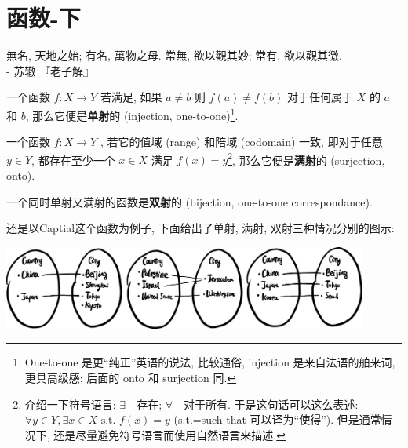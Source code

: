 \section{函数-下}\label{004}

\begin{flushright}{\kaishu 無名, 天地之始; 有名, 萬物之母. 常無, 欲以觀其妙; 常有, 欲以觀其徼. \\- 苏辙 『老子解』}\end{flushright}

\begin{tcolorbox}[size=fbox, breakable, enhanced jigsaw, title={单射, 满射, 双射 (injection, surjection,
bijection)}]

一个函数 $f:X\rightarrow Y$ 若满足, 如果 $a\neq b$ 则
$f(a)\neq f(b)$ 对于任何属于 $X$ 的 $a$ 和 $b$,
那么它便是\textbf{单射}的 (injection, one-to-one)\footnote{One-to-one
  是更``纯正''英语的说法, 比较通俗, injection 是来自法语的舶来词,
  更具高级感; 后面的 onto 和 surjection 同.}.

一个函数 $f:X\rightarrow Y$ , 若它的值域 (range) 和陪域 (codomain)
一致, 即对于任意 $y\in Y$, 都存在至少一个 $x\in X$ 满足
$f(x)=y$\footnote{介绍一下符号语言: $\exists$ - 存在; $\forall$ -
  对于所有. 于是这句话可以这么表述:
  $\forall y\in Y, \exists x\in X \text{ s.t. } f(x)=y$ (s.t.=such that
  可以译为``使得''). 但是通常情况下,
  还是尽量避免符号语言而使用自然语言来描述.}, 那么它便是\textbf{满射}的
(surjection, onto).

一个同时单射又满射的函数是\textbf{双射}的 (bijection, one-to-one
correspondance).

还是以Captial这个函数为例子, 下面给出了单射, 满射,
双射三种情况分别的图示:

\begin{tcolorbox}[size=fbox, breakable, enhanced jigsaw]
\begin{center}
\includegraphics[width=0.9\textwidth]{img/image-20230302091706069.png}
\end{center}

\end{tcolorbox}

\end{tcolorbox}

